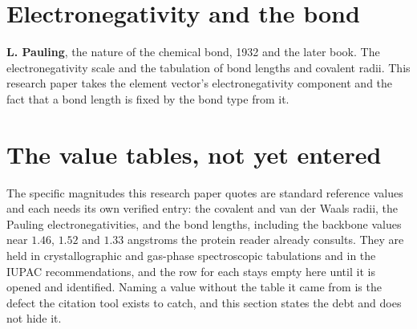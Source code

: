 \section*{Electronegativity and the bond}

\textbf{L. Pauling}, the nature of the chemical bond, 1932 and the later book. The electronegativity
scale and the tabulation of bond lengths and covalent radii. This research paper takes the element vector's
electronegativity component and the fact that a bond length is fixed by the bond type from it.

\section*{The value tables, not yet entered}

The specific magnitudes this research paper quotes are standard reference values and each needs its own
verified entry: the covalent and van der Waals radii, the Pauling electronegativities, and the bond
lengths, including the backbone values near $1.46$, $1.52$ and $1.33$ angstroms the protein reader
already consults. They are held in crystallographic and gas-phase spectroscopic tabulations and in
the IUPAC recommendations, and the row for each stays empty here until it is opened and identified.
Naming a value without the table it came from is the defect the citation tool exists to catch, and
this section states the debt and does not hide it.
